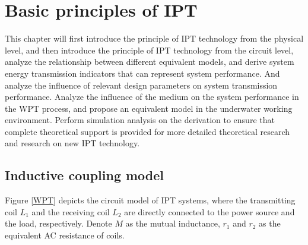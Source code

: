 \chapter{Basic principles of IPT}

This chapter will first introduce the principle of IPT technology from the physical level, and then introduce the principle of IPT technology from the circuit level, analyze the relationship between different equivalent models, and derive system energy transmission indicators that can represent system performance. And analyze the influence of relevant design parameters on system transmission performance. Analyze the influence of the medium on the system performance in the WPT process, and propose an equivalent model in the underwater working environment. Perform simulation analysis on the derivation to ensure that complete theoretical support is provided for more detailed theoretical research and research on new IPT technology.


\section{Inductive coupling model}
Figure \ref{WPT} depicts the circuit model of IPT systems, where the transmitting coil $L_1$ and the receiving coil $L_2$ are directly connected to the power source and the load, respectively. Denote $M$ as the mutual inductance, $r_1$ and $r_2$ as the equivalent AC resistance of coils.

